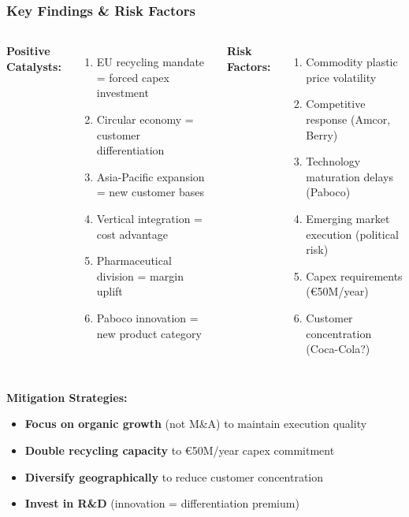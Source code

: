 \documentclass[aspectratio=169,12pt,xcolor=dvipsnames]{beamer}
\newcommand{\highlight}[1]{{\color{alpla_blue}\textbf{#1}}}
\begin{document}
\begin{frame}
  \frametitle{Key Findings \& Risk Factors}

  \begin{columns}[T]

    \textbf{\highlight{Positive Catalysts:}}
    \begin{enumerate}
      \item EU recycling mandate = forced capex investment
      \item Circular economy = customer differentiation
      \item Asia-Pacific expansion = new customer bases
      \item Vertical integration = cost advantage
      \item Pharmaceutical division = margin uplift
      \item Paboco innovation = new product category
    \end{enumerate}


    \textbf{\highlight{Risk Factors:}}
    \begin{enumerate}
      \item Commodity plastic price volatility
      \item Competitive response (Amcor, Berry)
      \item Technology maturation delays (Paboco)
      \item Emerging market execution (political risk)
      \item Capex requirements (€50M/year)
      \item Customer concentration (Coca-Cola?)
    \end{enumerate}

  \end{columns}

  \vspace{0.8cm}

  \textbf{Mitigation Strategies:}

  \begin{itemize}
    \item \highlight{Focus on organic growth} (not M\&A) to maintain execution quality
    \item \highlight{Double recycling capacity} to €50M/year capex commitment
    \item \highlight{Diversify geographically} to reduce customer concentration
    \item \highlight{Invest in R\&D} (innovation = differentiation premium)
  \end{itemize}

\end{frame}
\end{document}
